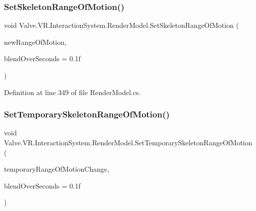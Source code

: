 \mbox{\label{class_valve_1_1_v_r_1_1_interaction_system_1_1_render_model_a78445f0b246f8ef9d0303cc0c2db102c}} 
\subsubsection{\texorpdfstring{SetSkeletonRangeOfMotion()}{SetSkeletonRangeOfMotion()}}
{\footnotesize\ttfamily void Valve.\+V\+R.\+Interaction\+System.\+Render\+Model.\+Set\+Skeleton\+Range\+Of\+Motion (\begin{DoxyParamCaption}\item[{\mbox{\hyperlink{namespace_valve_1_1_v_r_affc8d18345f8f5d36f1ae7b4ce534500}{E\+V\+R\+Skeletal\+Motion\+Range}}}]{new\+Range\+Of\+Motion,  }\item[{float}]{blend\+Over\+Seconds = {\ttfamily 0.1f} }\end{DoxyParamCaption})}



Definition at line 349 of file Render\+Model.\+cs.

\mbox{\label{class_valve_1_1_v_r_1_1_interaction_system_1_1_render_model_a76c76fbfa2a70f42e2587b9afd759043}} 
\subsubsection{\texorpdfstring{SetTemporarySkeletonRangeOfMotion()}{SetTemporarySkeletonRangeOfMotion()}}
{\footnotesize\ttfamily void Valve.\+V\+R.\+Interaction\+System.\+Render\+Model.\+Set\+Temporary\+Skeleton\+Range\+Of\+Motion (\begin{DoxyParamCaption}\item[{\mbox{\hyperlink{namespace_valve_1_1_v_r_aabb506007a41244de5c315ff5519439f}{Skeletal\+Motion\+Range\+Change}}}]{temporary\+Range\+Of\+Motion\+Change,  }\item[{float}]{blend\+Over\+Seconds = {\ttfamily 0.1f} }\end{DoxyParamCaption})}



